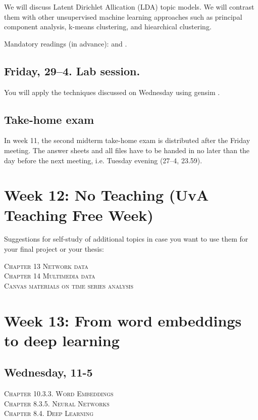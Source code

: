 We will discuss Latent Dirichlet Allication (LDA) topic models. We will contrast them with other unsupervised machine learning approaches such as principal component analysis, k-means clustering, and hiearchical clustering.

Mandatory readings (in advance): \cite{Maier2018a} and \cite{Tsur2015}.

\subsection*{Friday, 29--4. Lab session.}
You will apply the techniques discussed on Wednesday using gensim \citep{Rehurek2010}.


\subsection*{Take-home exam}
In week 11, the second midterm take-home exam is distributed after the Friday meeting. The answer sheets and all files have to be handed in no later than the day before the next meeting, i.e. Tuesday evening (27--4, 23.59).




\section*{Week 12: No Teaching (UvA Teaching Free Week)}
Suggestions for self-study of additional topics in case you want to use them for your final project or your thesis:

\noindent \textsc{ Chapter 13 Network data}\\
\textsc{ Chapter 14 Multimedia data}\\
\textsc{ Canvas materials on time series analysis}\\





\section*{Week 13: From word embeddings to deep learning}

\subsection*{Wednesday, 11-5}
\textsc{ Chapter 10.3.3. Word Embeddings}\\
\textsc{ Chapter 8.3.5. Neural Networks}\\
\textsc{ Chapter 8.4. Deep Learning}\\

